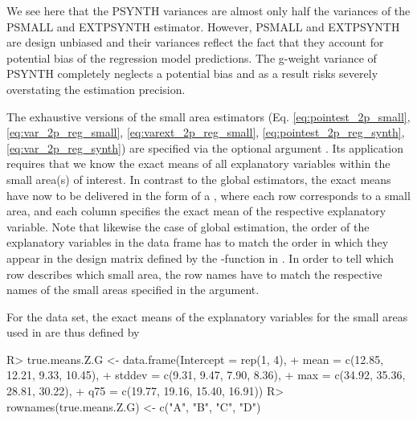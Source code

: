 \documentclass[article]{jss}
\begin{document}
We see here that the PSYNTH variances are almost only half the variances of the PSMALL and EXTPSYNTH estimator. However, PSMALL and EXTPSYNTH are design unbiased and their variances reflect the fact that they account for potential bias of the regression model predictions. The g-weight variance of PSYNTH completely neglects a potential bias and as a result risks severely overstating the estimation precision.\par

The exhaustive versions of the small area estimators (Eq. \ref{eq:pointest_2p_small}, \ref{eq:var_2p_reg_small}, \ref{eq:varext_2p_reg_small}, \ref{eq:pointest_2p_reg_synth}, \ref{eq:var_2p_reg_synth}) are specified via the optional argument . Its application requires that we know the exact means of all explanatory variables within the small area(s) of interest. In contrast to the global estimators, the exact means have now to be delivered in the form of a , where each row corresponds to a small area, and each column specifies the exact mean of the respective explanatory variable. Note that likewise the case of global estimation, the order of the explanatory variables in the data frame has to match the order in which they appear in the design matrix defined by the -function in . In order to tell  which row describes which small area, the row names have to match the respective names of the small areas specified in the  argument.

For the  data set, the exact means of the explanatory variables for the small areas used in \citet{mandallaz2013b} are thus defined by

\begin{Schunk}
\end{Schunk}


\begin{Schunk}
\begin{Sinput}
R> true.means.Z.G <- data.frame(Intercept = rep(1, 4),
+    mean = c(12.85, 12.21, 9.33, 10.45),
+    stddev = c(9.31, 9.47, 7.90, 8.36),
+    max = c(34.92, 35.36, 28.81, 30.22),
+    q75 = c(19.77, 19.16, 15.40, 16.91))
R> rownames(true.means.Z.G) <- c("A", "B", "C", "D")
\end{Sinput}
\end{Schunk}
\end{document}

